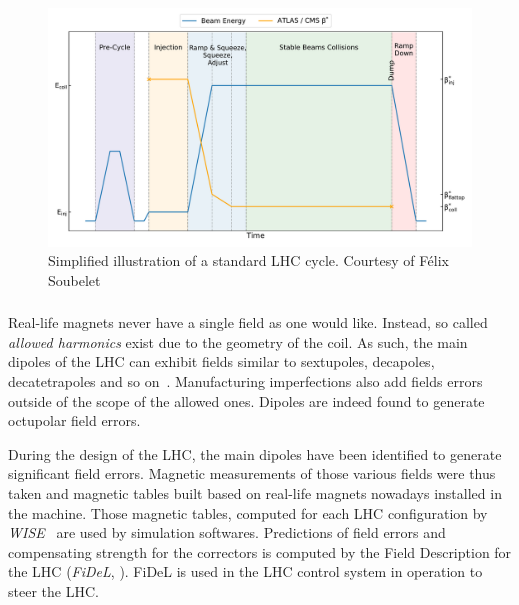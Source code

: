 \begin{figure}[H]
    \includegraphics[width=\textwidth]{./images/lhc_cycle.pdf}
    \caption{Simplified illustration of a standard LHC cycle. Courtesy of Félix
    Soubelet~\cite{felix_soubelet_local_2023}} \label{fig:cern_complex:cycle}
\end{figure}


\subsubsection{}

Real-life magnets never have a single field as one would like. Instead, so called 
\textit{allowed harmonics} exist due to the geometry of the coil. As such, the main dipoles of the
LHC can exhibit fields similar to sextupoles, decapoles, decatetrapoles and so
on~\cite{deniau_magnetic_2009}. Manufacturing imperfections also add fields errors outside of the
scope of the allowed ones. Dipoles are indeed found to generate octupolar field errors.

During the design of the LHC, the main dipoles have been identified to generate significant field
errors. Magnetic measurements of those various fields were thus taken and magnetic tables built
based on real-life magnets nowadays installed in the machine. Those magnetic tables, computed for
each LHC configuration by \textit{WISE}~ are used by simulation softwares.
Predictions of field errors and compensating strength for the correctors is computed by the Field
Description for the LHC (\textit{FiDeL}, \cite{noauthor_fidel_2021}). FiDeL is used in the LHC
control system in operation to steer the LHC.

